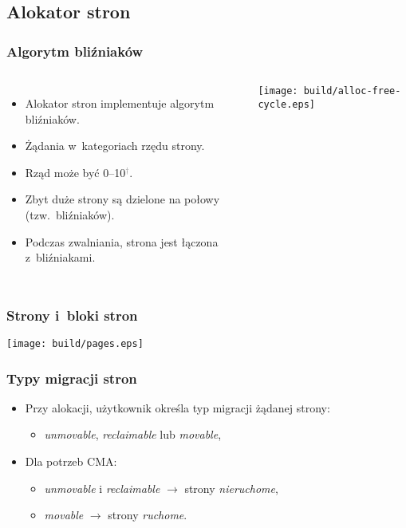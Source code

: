 
\subsection{Alokator stron}

\begin{frame}
  \frametitle{Algorytm bliźniaków}
  \begin{columns}[c]

    \begin{itemize}
    \item Alokator stron implementuje algorytm bliźniaków.
    \item Żądania w~kategoriach rzędu strony.
    \item Rząd może być 0--10\textcolor{gray}{$^\dagger$}.
    \item Zbyt duże strony są dzielone na połowy (tzw.\ bliźniaków).
    \item Podczas zwalniania, strona jest łączona z~bliźniakami.
    \end{itemize}

    \begin{center}
    \texttt{[image: build/alloc-free-cycle.eps]}
    \end{center}
  \end{columns}
\end{frame}

\begin{frame}
  \frametitle{Strony i~bloki stron}
  \begin{center}
  \texttt{[image: build/pages.eps]}
  \end{center}
\end{frame}

\begin{frame}[fragile]
  \frametitle{Typy migracji stron}

  \begin{itemize}
  \item Przy alokacji, użytkownik określa typ migracji żądanej strony:
    \begin{itemize}
    \item \textit{unmovable}, \textit{reclaimable} lub \textit{movable},
    \end{itemize}
  \item Dla potrzeb CMA:
    \begin{itemize}
    \item \textit{unmovable} i \textit{reclaimable} $\rightarrow$ strony
      \textsl{nieruchome},
    \item \textit{movable} $\rightarrow$ strony \textsl{ruchome}.
    \end{itemize}
  \end{itemize}
\end{frame}

